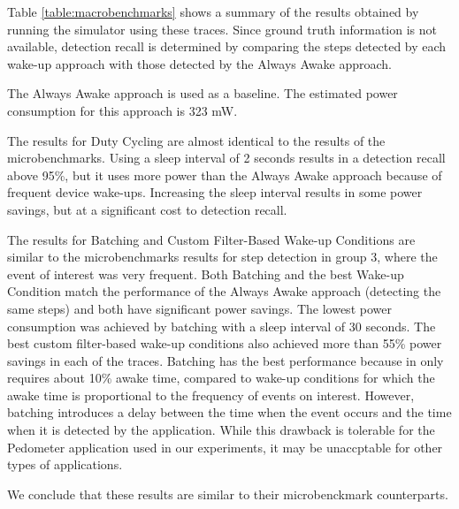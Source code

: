 Table \ref{table:macrobenchmarks} shows a summary of the results obtained by running the simulator using these traces. Since ground truth information is not available, detection recall is determined by comparing the steps detected by each wake-up approach with those detected by the Always Awake approach.

The Always Awake approach is used as a baseline. The estimated power consumption for this approach is 323 mW.

The results for Duty Cycling are almost identical to the results of the microbenchmarks. Using a sleep interval of 2 seconds results in a detection recall above 95\%, but it uses more power than the Always Awake approach because of frequent device wake-ups. Increasing the sleep interval results in some power savings, but at a significant cost to detection recall.

The results for Batching and Custom Filter-Based Wake-up Conditions are similar to the microbenchmarks results for step detection in group 3, where the event of interest was very frequent. Both Batching and the best Wake-up Condition match the performance of the Always Awake approach (detecting the same steps) and both have significant power savings. The lowest power consumption was achieved by batching with a sleep interval of 30 seconds. The best custom filter-based wake-up conditions also achieved more than 55\% power savings in each of the traces. Batching has the best performance because in only requires about 10\% awake time, compared to wake-up conditions for which the awake time is proportional to the frequency of events on interest. However, batching introduces a delay between the time when the event occurs and the time when it is detected by the application. While this drawback is tolerable for the Pedometer application used in our experiments, it may be unaccptable for other types of applications. 

We conclude that these results are similar to their microbenckmark counterparts.


